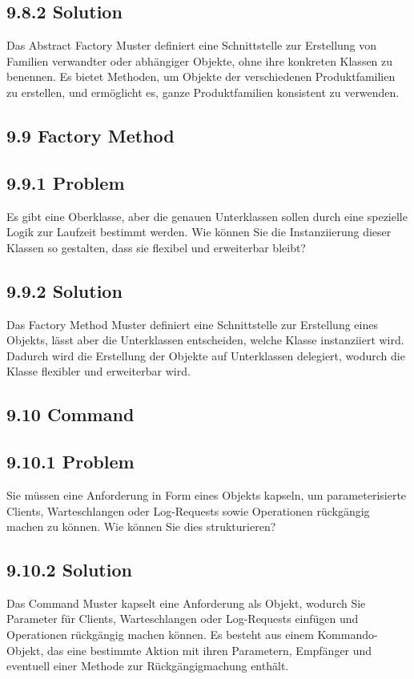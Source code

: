 \documentclass[10pt]{article}
\begin{document}
\subsection*{9.8.2 Solution}
Das Abstract Factory Muster definiert eine Schnittstelle zur Erstellung von Familien verwandter oder abhängiger Objekte, ohne ihre konkreten Klassen zu benennen. Es bietet Methoden, um Objekte der verschiedenen Produktfamilien\\
zu erstellen, und ermöglicht es, ganze Produktfamilien konsistent zu verwenden.

\subsection*{9.9 Factory Method}
\subsection*{9.9.1 Problem}
Es gibt eine Oberklasse, aber die genauen Unterklassen sollen durch eine spezielle Logik zur Laufzeit bestimmt werden. Wie können Sie die Instanziierung dieser Klassen so gestalten, dass sie flexibel und erweiterbar bleibt?

\subsection*{9.9.2 Solution}
Das Factory Method Muster definiert eine Schnittstelle zur Erstellung eines Objekts, lässt aber die Unterklassen entscheiden, welche Klasse instanziiert wird. Dadurch wird die Erstellung der Objekte auf Unterklassen delegiert, wodurch die Klasse flexibler und erweiterbar wird.

\subsection*{9.10 Command}
\subsection*{9.10.1 Problem}
Sie müssen eine Anforderung in Form eines Objekts kapseln, um parameterisierte Clients, Warteschlangen oder Log-Requests sowie Operationen rückgängig machen zu können. Wie können Sie dies strukturieren?

\subsection*{9.10.2 Solution}
Das Command Muster kapselt eine Anforderung als Objekt, wodurch Sie Parameter für Clients, Warteschlangen oder Log-Requests einfügen und Operationen rückgängig machen können. Es besteht aus einem Kommando-Objekt, das eine bestimmte Aktion mit ihren Parametern, Empfänger und eventuell einer Methode zur Rückgängigmachung enthält.
\end{document}
